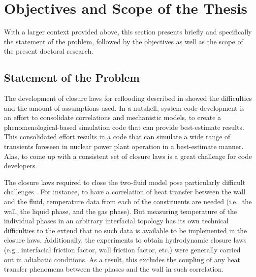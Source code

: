 \section{Objectives and Scope of the Thesis}\label{sec:intro_objectives_and_scope}

With a larger context provided above,
this section presents briefly and specifically the statement of the problem,
followed by the objectives as well as the scope of the present doctoral research.

\subsection{Statement of the Problem}\label{sub:intro_statement_of_problem}

The development of closure laws for reflooding described in \cite{Nelson1992,USNRC2012} showed the difficulties and the amount of assumptions used.
In a nutshell, system code development is an effort to consolidate correlations and mechanistic models, to create a phenomenological-based simulation code that can provide best-estimate results.
This consolidated effort results in a code that can simulate a wide range of transients foreseen in nuclear power plant operation in a best-estimate manner.
Alas, to come up with a consistent set of closure laws is a great challenge for code developers.

The closure laws required to close the two-fluid model pose particularly difficult challenges \cite{Wulff2007}.
For instance, to have a correlation of heat transfer between the wall and the fluid, temperature data from each of the constituents are needed (i.e., the wall, the liquid phase, and the gas phase).
But measuring temperature of the individual phases in an arbitrary interfacial topology has its own technical difficulties to the extend that no such data is available to be implemented in the closure laws.
Additionally, the experiments to obtain hydrodynamic closure laws (e.g., interfacial friction factor, wall friction factor, etc.) were generally carried out in adiabatic conditions.
As a result, this excludes the coupling of any heat transfer phenomena between the phases and the wall in such correlation.

